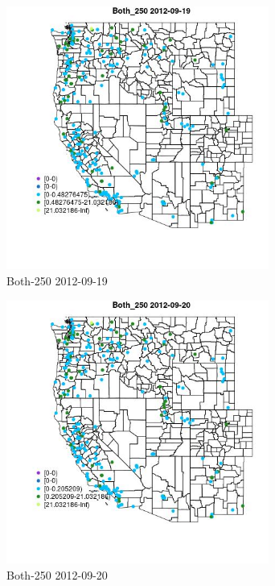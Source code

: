 \begin{figure} 
\centering  
\includegraphics[width=0.77\textwidth]{Code_Outputs/ML_input_report_ML_input_PM25_Step5_part_d_de_duplicated_aves_ML_input_MapObsBoth_2502012-09-19.jpg} 
\caption{\label{fig:ML_input_report_ML_input_PM25_Step5_part_d_de_duplicated_aves_ML_inputMapObsBoth_2502012-09-19}Both-250 2012-09-19} 
\end{figure} 
 

\begin{figure} 
\centering  
\includegraphics[width=0.77\textwidth]{Code_Outputs/ML_input_report_ML_input_PM25_Step5_part_d_de_duplicated_aves_ML_input_MapObsBoth_2502012-09-20.jpg} 
\caption{\label{fig:ML_input_report_ML_input_PM25_Step5_part_d_de_duplicated_aves_ML_inputMapObsBoth_2502012-09-20}Both-250 2012-09-20} 
\end{figure} 
 

